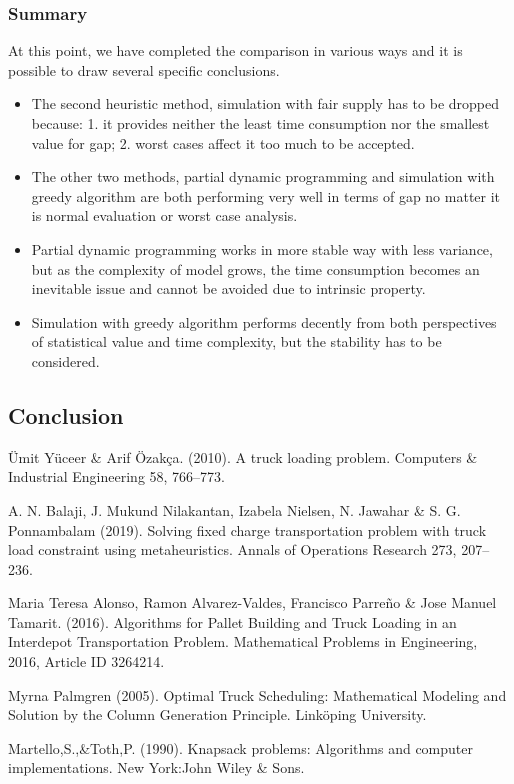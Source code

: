 \documentclass{article}
\begin{document}
\subsubsection{Summary}
At this point, we have completed the comparison in various ways and it is possible to draw several specific conclusions.

\begin{itemize}
\item The second heuristic method, simulation with fair supply has to be dropped because: 1. it provides neither the least time consumption nor the smallest value for gap; 2. worst cases affect it too much to be accepted.
\item The other two methods, partial dynamic programming and simulation with greedy algorithm are both performing very well in terms of gap no matter it is normal evaluation or worst case analysis.
\item Partial dynamic programming works in more stable way with less variance, but as the complexity of model grows, the time consumption becomes an inevitable issue and cannot be avoided due to intrinsic property.
\item Simulation with greedy algorithm performs decently from both perspectives of statistical value and time complexity, but the stability has to be considered.
\end{itemize}

\subsection{Conclusion }


  

\begin{thebibliography}{1}

Ümit Yüceer \& Arif Özakça. (2010). 
\newblock A truck loading problem. Computers \& Industrial Engineering 58, 766–773.

A. N. Balaji, J. Mukund Nilakantan, Izabela Nielsen, N. Jawahar \& S. G. Ponnambalam (2019).
\newblock Solving fixed charge transportation problem with truck load constraint using metaheuristics. Annals of Operations Research 273, 207–236.

Maria Teresa Alonso, Ramon Alvarez-Valdes, Francisco Parreño \& Jose Manuel Tamarit. (2016).
\newblock Algorithms for Pallet Building and Truck Loading in an Interdepot Transportation Problem. Mathematical Problems in Engineering, 2016, Article ID 3264214.

Myrna Palmgren (2005).
\newblock Optimal Truck Scheduling: Mathematical Modeling and Solution by the Column Generation Principle. Linköping University.

Martello,S.,\&Toth,P. (1990).
\newblock Knapsack problems: Algorithms and computer implementations. New York:John Wiley \& Sons.

\end{thebibliography}
\end{document}
